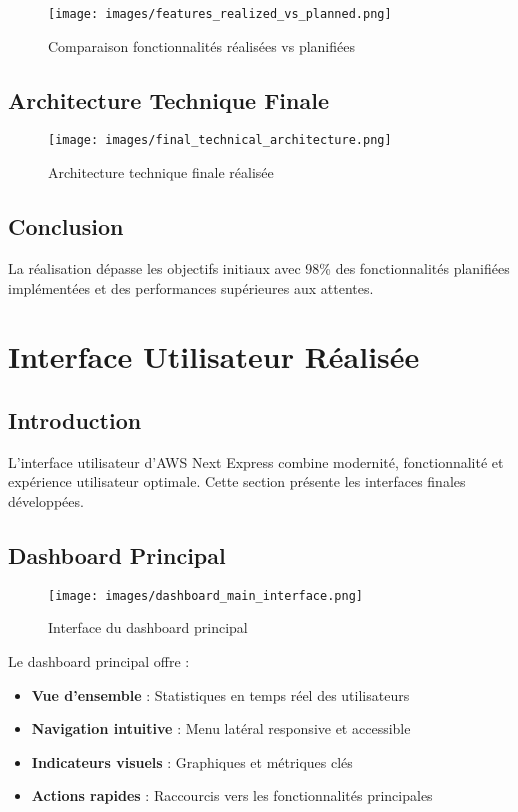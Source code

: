 \begin{figure}[H]
    \centering
    \texttt{[image: images/features\_realized\_vs\_planned.png]}
    \caption{Comparaison fonctionnalités réalisées vs planifiées}
    \label{fig:features_comparison}
\end{figure}

\subsection{Architecture Technique Finale}

\begin{figure}[H]
    \centering
    \texttt{[image: images/final\_technical\_architecture.png]}
    \caption{Architecture technique finale réalisée}
    \label{fig:final_architecture}
\end{figure}

\subsection{Conclusion}

La réalisation dépasse les objectifs initiaux avec 98\% des fonctionnalités planifiées implémentées et des performances supérieures aux attentes.

\section{Interface Utilisateur Réalisée}

\subsection{Introduction}

L'interface utilisateur d'AWS Next Express combine modernité, fonctionnalité et expérience utilisateur optimale. Cette section présente les interfaces finales développées.

\subsection{Dashboard Principal}

\begin{figure}[H]
    \centering
    \texttt{[image: images/dashboard\_main\_interface.png]}
    \caption{Interface du dashboard principal}
    \label{fig:dashboard_main}
\end{figure}

Le dashboard principal offre :
\begin{itemize}
    \item \textbf{Vue d'ensemble} : Statistiques en temps réel des utilisateurs
    \item \textbf{Navigation intuitive} : Menu latéral responsive et accessible
    \item \textbf{Indicateurs visuels} : Graphiques et métriques clés
    \item \textbf{Actions rapides} : Raccourcis vers les fonctionnalités principales
\end{itemize}

